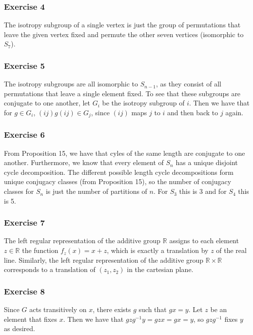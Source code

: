 \subsubsection{Exercise 4}
The isotropy subgroup of a single vertex is just the group of permutations that leave the given vertex fixed
and permute the other seven vertices (isomorphic to $S_7$).

\subsubsection{Exercise 5}
The isotropy subgroups are all isomorphic to $S_{n - 1}$, as they consist of all permutations that leave a 
single element fixed. To see that these subgroups are conjugate to one another, let $G_i$ be the isotropy
subgroup of $i$. Then we have that for  $g \in G_i$, $(i j) g (i j) \in G_j$, since $(i j)$ maps $j$ to $i$ 
and then back to $j$ again.

\subsubsection{Exercise 6}
From Proposition 15, we have that cyles of the same length are conjugate to one another. Furthermore,
we know that every element of $S_n$ has a unique disjoint cycle decomposition. The different possible length
cycle decompositions form unique conjugacy classes (from Proposition 15), so the number of conjugacy classes
for $S_n$ is just the number of partitions of $n$. For $S_3$ this is 3 and for $S_4$ this is 5.

\subsubsection{Exercise 7}
The left regular representation of the additive group  $\mathbb{R}$ assigns to each element $z \in \mathbb{R}$ 
the function $f_z(x) = x + z$, which is exactly a translation by $z$ of the real line. Similarly,
the left regular representation of the additive group $\mathbb{R} \times \mathbb{R}$ corresponds to a
translation of $(z_1, z_2)$ in the cartesian plane.

\subsubsection{Exercise 8}
Since $G$ acts transitively on $x$, there exists $g$ such that $gx = y$. Let $z$ be an element that fixes 
$x$. Then we have that $gzg^{-1} y = gzx = gx = y$, so $gzg^{-1}$ fixes $y$ as desired.

